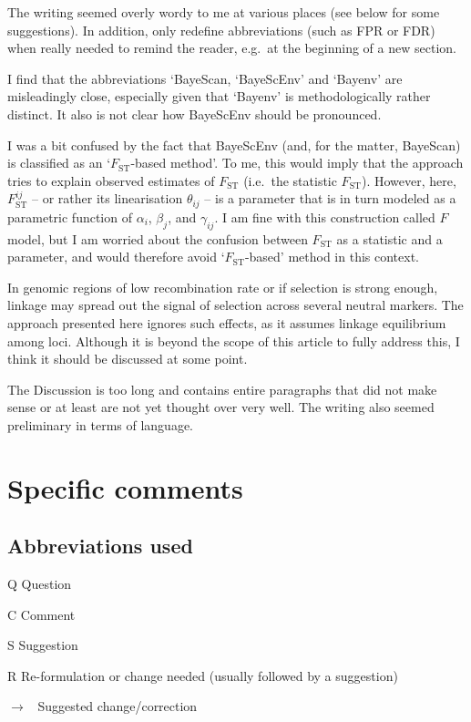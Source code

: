 \documentclass[11pt]{article}
\newenvironment{my_description}
{\begin{description}
  \setlength{\itemsep}{2pt}
  \setlength{\parskip}{0pt}
  \setlength{\parsep}{0pt}}
{\end{description}}
\newenvironment{my_enumerate}
{\begin{enumerate}
  \setlength{\itemsep}{2pt}
  \setlength{\parskip}{0pt}
  \setlength{\parsep}{0pt}}
{\end{enumerate}}
\newcommand{\ra}{$\rightarrow$\ }
\newcommand{\C}{\textbf{C:}\ }
\newcommand{\Q}{\textbf{Q:}\ }
\newcommand{\R}{\textbf{R:}\ }
\newcommand{\V}{\textbf{S:}\ }
\begin{document}
\begin{my_enumerate}
	\item The writing seemed overly wordy to me at various places (see below for some suggestions). In addition, only redefine abbreviations (such as FPR or FDR) when really needed to remind the reader, e.g.\ at the beginning of a new section.
	
	\item I find that the abbreviations `BayeScan, `BayeScEnv' and `Bayenv' are misleadingly close, especially given that `Bayenv' is methodologically rather distinct. It also is not clear how BayeScEnv should be pronounced.
	
	\item I was a bit confused by the fact that BayeScEnv (and, for the matter, BayeScan) is classified as an `$F_{\mathrm{ST}}$-based method'. To me, this would imply that the approach tries to explain observed estimates of $F_{\mathrm{ST}}$ (i.e.\ the statistic $F_{\mathrm{ST}}$). However, here, $F^{ij}_{\mathrm{ST}}$ -- or rather its linearisation $\theta_{ij}$ -- is a parameter that is in turn modeled as a parametric function of $\alpha_i$, $\beta_j$, and $\gamma_{ij}$. I am fine with this construction called $F$ model, but I am worried about the confusion between $F_{\mathrm{ST}}$ as a statistic and a parameter, and would therefore avoid `$F_{\mathrm{ST}}$-based' method in this context.
	
	\item In genomic regions of low recombination rate or if selection is strong enough, linkage may spread out the signal of selection across several neutral markers. The approach presented here ignores such effects, as it assumes linkage equilibrium among loci. Although it is beyond the scope of this article to fully address this, I think it should be discussed at some point.
	
	\item The Discussion is too long and contains entire paragraphs that did not make sense or at least are not yet thought over very well. The writing also seemed preliminary in terms of language.
	
\end{my_enumerate}
	

\section{Specific comments}

\subsection{Abbreviations used}
\begin{my_description}
	\item[Q] Question %
	\item[C] Comment %
	\item[S] Suggestion %
	\item[R] Re-formulation or change needed (usually followed by a suggestion) %
	\item[\ra] Suggested change/correction
\end{my_description}
\end{document}
